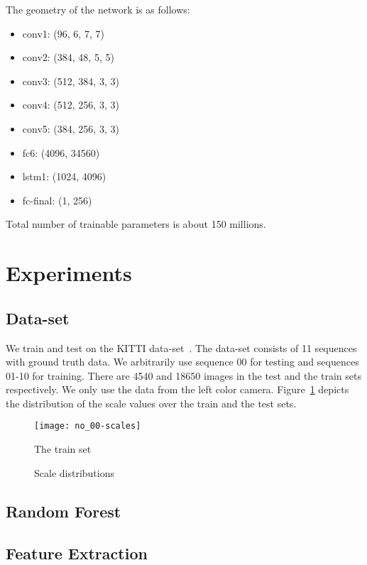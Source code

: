 The geometry of the network is as follows:
\begin{itemize}
\item conv1: (96, 6, 7, 7)
\item conv2: (384, 48, 5, 5)
\item conv3: (512, 384, 3, 3)
\item conv4: (512, 256, 3, 3)
\item conv5: (384, 256, 3, 3)
\item fc6:   (4096, 34560)
\item lstm1: (1024, 4096)
\item fc-final: (1, 256)
\end{itemize}
Total number of trainable parameters is about 150 millions.

\section{Experiments}

\subsection{Data-set}

We train and test on the KITTI data-set~\cite{geiger2013vision}.  The
data-set consists of 11 sequences with ground truth data.  We
arbitrarily use sequence 00 for testing and sequences 01-10 for
training.  There are 4540 and 18650 images in the test and the train
sets respectively. We only use the data from the left color camera.
Figure~\ref{fig:scales} depicts the distribution of the scale values
over the train and the test sets.

\begin{figure}[!ht]
  \texttt{[image: no\_00-scales]}
  \caption{The train set}
  \label{fig:stats-no_00}
  \caption{Scale distributions}
  \label{fig:scales}
\end{figure}

\subsection{Random Forest}

\subsection{Feature Extraction}\label{sec:features}

